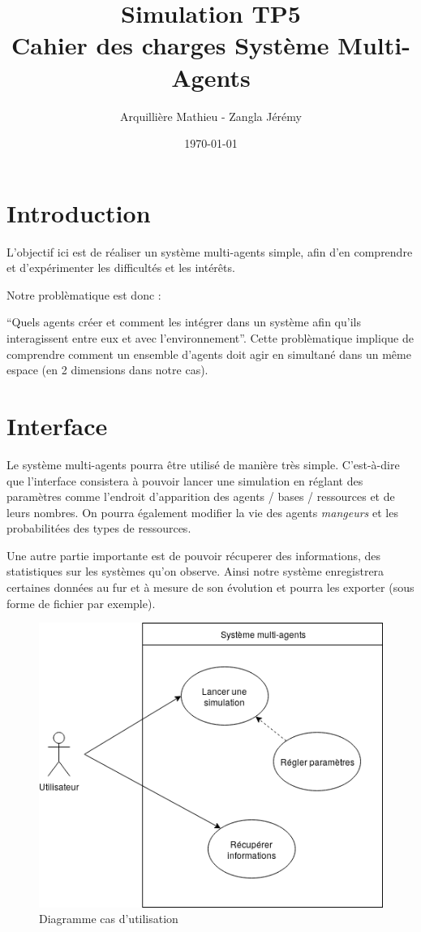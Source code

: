 \documentclass{article}
\title{Simulation TP5\\Cahier des charges Système Multi-Agents}
\author{Arquillière Mathieu - Zangla Jérémy}
\date{\today}
\begin{document}
\begin{titlepage}
  \maketitle
\end{titlepage}

\tableofcontents
\listoffigures
\newpage

\section{Introduction}
L'objectif ici est de réaliser un système multi-agents simple, afin d'en
comprendre et d'expérimenter les difficultés et les intérêts.

Notre problèmatique est donc :

\enquote{Quels agents créer et comment les intégrer dans un système afin
qu'ils interagissent entre eux et avec l'environnement}.
Cette problèmatique implique de comprendre comment un ensemble d'agents doit agir
en simultané dans un même espace (en 2 dimensions dans notre cas).

\section{Interface}
Le système multi-agents pourra être utilisé de manière très simple. C'est-à-dire
que l'interface consistera à pouvoir lancer une simulation en réglant des paramètres
comme l'endroit d'apparition des agents / bases / ressources et de leurs nombres. On
pourra également modifier la vie des agents \emph{mangeurs} et les probabilitées des
types de ressources.

Une autre partie importante est de pouvoir récuperer des informations, des statistiques
sur les systèmes qu'on observe. Ainsi notre système enregistrera certaines données
au fur et à mesure de son évolution et pourra les exporter (sous forme de fichier
par exemple).

\begin{figure}[!ht]
  \centering
  \caption{Diagramme cas d'utilisation}
  \includegraphics[scale=0.70]{img/usecase.png}
\end{figure}
\end{document}
